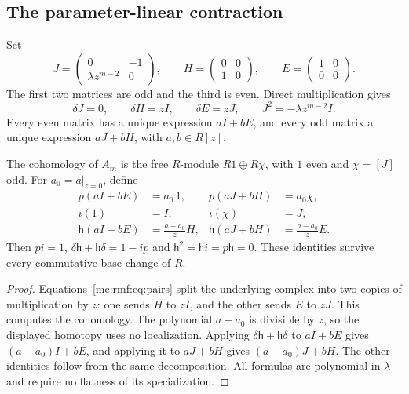 \subsection{The parameter-linear contraction}

Set
\begin{equation}\label{mc:rmf:eq:matrices}
 J=\begin{pmatrix}0&-1\\\lambda z^{m-2}&0\end{pmatrix},
 \qquad H=\begin{pmatrix}0&0\\1&0\end{pmatrix},
 \qquad E=\begin{pmatrix}1&0\\0&0\end{pmatrix}.
\end{equation}
The first two matrices are odd and the third is even.
Direct multiplication gives
\begin{equation}\label{mc:rmf:eq:pairs}
 \delta J=0,\qquad \delta H=zI,\qquad
 \delta E=zJ,\qquad J^2=-\lambda z^{m-2}I.
\end{equation}
Every even matrix has a unique expression $aI+bE$,
and every odd matrix a unique expression $aJ+bH$,
with $a,b\in R[z]$.

\begin{proposition}\label{mc:rmf:prop:contraction}
The cohomology of $A_m$ is the free $R$-module
$R1\oplus R\chi$, with $1$ even and $\chi=[J]$ odd.
For $a_0=a|_{z=0}$, define
\begin{align*}
 p(aI+bE)&=a_0\,1,&p(aJ+bH)&=a_0\chi,\\
 i(1)&=I,&i(\chi)&=J,\\
 \mathsf h(aI+bE)&=\frac{a-a_0}{z}H,
 &\mathsf h(aJ+bH)&=\frac{a-a_0}{z}E.
\end{align*}
Then $pi=1$, $\delta\mathsf h+\mathsf h\delta=1-ip$ and
$\mathsf h^2=\mathsf h i=p\mathsf h=0$. These identities survive every
commutative base change of $R$.
\end{proposition}

\begin{proof}
Equations~\eqref{mc:rmf:eq:pairs} split the underlying
complex into two copies of multiplication by $z$:
one sends $H$ to $zI$, and the other sends $E$ to $zJ$.
This computes the cohomology. The polynomial $a-a_0$
is divisible by $z$, so the displayed homotopy uses
no localization. Applying $\delta\mathsf h+\mathsf h\delta$ to
$aI+bE$ gives $(a-a_0)I+bE$, and applying it to
$aJ+bH$ gives $(a-a_0)J+bH$.
The other identities follow from the same decomposition.
All formulas are polynomial in $\lambda$ and require
no flatness of its specialization.
\end{proof}

